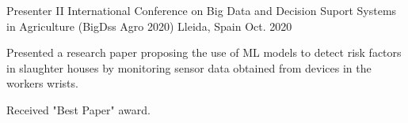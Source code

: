 

\begin{cventries}

  \cventry
    {Presenter} %
      {II International Conference on Big Data and Decision Suport Systems in Agriculture (BigDss Agro 2020) } %
    {Lleida, Spain} %
    {Oct. 2020} %
    {
      \begin{cvitems} %
        \item {Presented a research paper proposing the use of ML models to detect risk factors in slaughter houses by monitoring sensor data obtained from devices in the workers wrists.}
        \item {Received "Best Paper" award.}
      \end{cvitems}
    }

\end{cventries}
